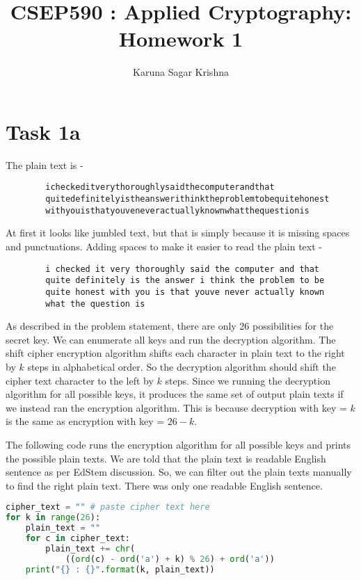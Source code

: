 \documentclass{article}
\title{CSEP590 : Applied Cryptography: Homework 1}
\author{Karuna Sagar Krishna}
\begin{document}
    \maketitle

    \section*{Task 1a}
    The plain text is - 
    \begin{verbatim}
        icheckeditverythoroughlysaidthecomputerandthat
        quitedefinitelyistheanswerithinktheproblemtobequitehonest
        withyouisthatyouveneveractuallyknownwhatthequestionis
    \end{verbatim}

    At first it looks like jumbled text, but that is simply because it is missing spaces and punctuations. Adding spaces to make it easier to read the plain text - 
    \begin{verbatim}
        i checked it very thoroughly said the computer and that 
        quite definitely is the answer i think the problem to be 
        quite honest with you is that youve never actually known 
        what the question is
    \end{verbatim}

    As described in the problem statement, there are only 26 possibilities for the secret key. We can enumerate all keys and run the decryption algorithm. The shift cipher encryption algorithm shifts each character in plain text to the right by $k$ steps in alphabetical order. So the decryption algorithm should shift the cipher text character to the left by $k$ steps. Since we running the decryption algorithm for all possible keys, it produces the same set of output plain texts if we instead ran the encryption algorithm. This is because decryption with key = $k$ is the same as encryption with key = $26-k$.

    The following code runs the encryption algorithm for all possible keys and prints the possible plain texts. We are told that the plain text is readable English sentence as per EdStem discussion. So, we can filter out the plain texts manually to find the right plain text. There was only one readable English sentence.

    \begin{lstlisting}[language=Python]
cipher_text = "" # paste cipher text here
for k in range(26):
    plain_text = ""
    for c in cipher_text:
        plain_text += chr(
            ((ord(c) - ord('a') + k) % 26) + ord('a'))
    print("{} : {}".format(k, plain_text))
    \end{lstlisting}
\end{document}
